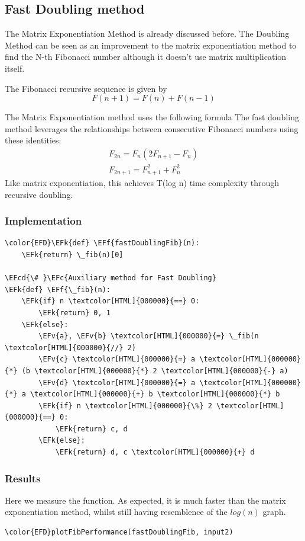 \documentclass[a4paper,12pt]{article}
\newcommand{\EFc}[1]{\textcolor{EFc}{#1}} %
\newcommand{\EFcd}[1]{\textcolor{EFcd}{#1}} %
\newcommand{\EFk}[1]{\textcolor{EFk}{#1}} %
\newcommand{\EFf}[1]{\textcolor{EFf}{#1}} %
\newcommand{\EFv}[1]{\textcolor{EFv}{#1}} %
\begin{document}
\subsection{Fast Doubling method}
\label{sec:org889354d}
The Matrix Exponentiation Method is already discussed before. The Doubling Method can be seen as an improvement to the matrix exponentiation method to find the N-th Fibonacci number although it doesn’t use matrix multiplication itself.

The Fibonacci recursive sequence is given by 
\[
F(n+1) = F(n) + F(n-1)
\]

The Matrix Exponentiation method uses the following formula
The fast doubling method leverages the relationships between consecutive Fibonacci numbers using these identities:
\begin{align}
\label{eq:4}
F_{2n} = F_n(2F_{n+1} - F_n) \\
F_{2n+1} = F_{n+1}^2 + F_n^2
\end{align}
Like matrix exponentiation, this achieves T(log n) time complexity through recursive doubling.
\subsubsection{Implementation}
\label{sec:org3c4d57e}
\begin{Code}
\begin{Verbatim}
\color{EFD}\EFk{def} \EFf{fastDoublingFib}(n):
    \EFk{return} \_fib(n)[0]

\EFcd{\# }\EFc{Auxiliary method for Fast Doubling}
\EFk{def} \EFf{\_fib}(n):
    \EFk{if} n \textcolor[HTML]{000000}{==} 0:
        \EFk{return} 0, 1
    \EFk{else}:
        \EFv{a}, \EFv{b} \textcolor[HTML]{000000}{=} \_fib(n \textcolor[HTML]{000000}{//} 2)
        \EFv{c} \textcolor[HTML]{000000}{=} a \textcolor[HTML]{000000}{*} (b \textcolor[HTML]{000000}{*} 2 \textcolor[HTML]{000000}{-} a)
        \EFv{d} \textcolor[HTML]{000000}{=} a \textcolor[HTML]{000000}{*} a \textcolor[HTML]{000000}{+} b \textcolor[HTML]{000000}{*} b
        \EFk{if} n \textcolor[HTML]{000000}{\%} 2 \textcolor[HTML]{000000}{==} 0:
            \EFk{return} c, d
        \EFk{else}:
            \EFk{return} d, c \textcolor[HTML]{000000}{+} d
\end{Verbatim}
\end{Code}
\subsubsection{Results}
\label{sec:orgf333d80}
Here we measure the function. As expected, it is much faster than the matrix exponentiation method, whilst still having resemblence of the \(log(n)\) graph.
\begin{Code}
\begin{Verbatim}
\color{EFD}plotFibPerformance(fastDoublingFib, input2)
\end{Verbatim}
\end{Code}
\end{document}
